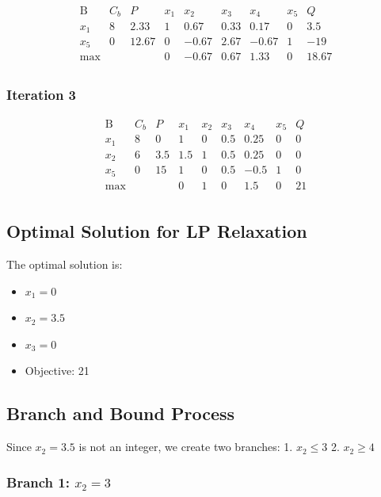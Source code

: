 \documentclass[12pt]{article}
\begin{document}
\[
\begin{array}{c|ccccc|c}
\text{B} & C_b & P & x_1 & x_2 & x_3 & x_4 & x_5 & Q \\
\hline
x_1 & 8 & 2.33 & 1 & 0.67 & 0.33 & 0.17 & 0 & 3.5 \\
x_5 & 0 & 12.67 & 0 & -0.67 & 2.67 & -0.67 & 1 & -19 \\
\hline
\text{max} & & & 0 & -0.67 & 0.67 & 1.33 & 0 & 18.67 \\
\end{array}
\]

\subsubsection*{Iteration 3}

\[
\begin{array}{c|ccccc|c}
\text{B} & C_b & P & x_1 & x_2 & x_3 & x_4 & x_5 & Q \\
\hline
x_1 & 8 & 0 & 1 & 0 & 0.5 & 0.25 & 0 & 0 \\
x_2 & 6 & 3.5 & 1.5 & 1 & 0.5 & 0.25 & 0 & 0 \\
x_5 & 0 & 15 & 1 & 0 & 0.5 & -0.5 & 1 & 0 \\
\hline
\text{max} & & & 0 & 1 & 0 & 1.5 & 0 & 21 \\
\end{array}
\]

\subsection*{Optimal Solution for LP Relaxation}

The optimal solution is:

\begin{itemize}
    \item \(x_1 = 0\)
    \item \(x_2 = 3.5\)
    \item \(x_3 = 0\)
    \item Objective: 21
\end{itemize}

\subsection*{Branch and Bound Process}

Since \(x_2 = 3.5\) is not an integer, we create two branches:
1. \(x_2 \leq 3\)
2. \(x_2 \geq 4\)

\subsubsection*{Branch 1: \(x_2 = 3\)}
\end{document}
